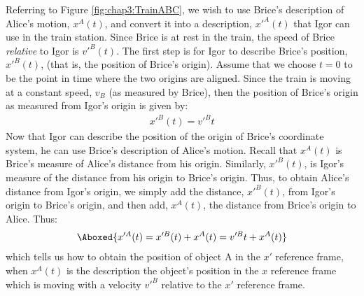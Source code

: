 Referring to Figure \ref{fig:chap3:TrainABC}, we wish to use Brice's description of Alice's motion, $x^A(t)$, and convert it into a description, $x'^A(t)$ that Igor can use in the train station. Since Brice is at rest in the train, the speed of Brice \textit{relative} to Igor is $v'^B(t)$. The first step is for Igor to describe Brice's position, $x'^B(t)$, (that is, the position of Brice's origin). Assume that we choose $t=0$ to be the point in time where the two origins are aligned. Since the train is moving at a constant speed, $v_B$ (as measured by Brice), then the position of Brice's origin as measured from Igor's origin is given by:
\begin{align*}
x'^B(t)=v'^Bt
\end{align*}
Now that Igor can describe the position of the origin of Brice's coordinate system, he can use Brice's description of Alice's motion. Recall that $x^A(t)$ is Brice's measure of Alice's distance from his origin. Similarly, $x'^B(t)$, is Igor's measure of the distance from his origin to Brice's origin. Thus, to obtain Alice's distance from Igor's origin, we simply add the distance, $x'^B(t)$, from Igor's origin to Brice's origin, and then add, $x^A(t)$, the distance from Brice's origin to Alice. Thus:
\begin{align}
\Aboxed{x'^A(t)=x'^B(t)+x^A(t)=v'^Bt+x^A(t)}
\end{align}
which tells us how to obtain the position of object A in the $x'$ reference frame, when $x^A(t)$ is the description the object's position in the $x$ reference frame which is moving with a velocity $v'^B$ relative to the $x'$ reference frame.

